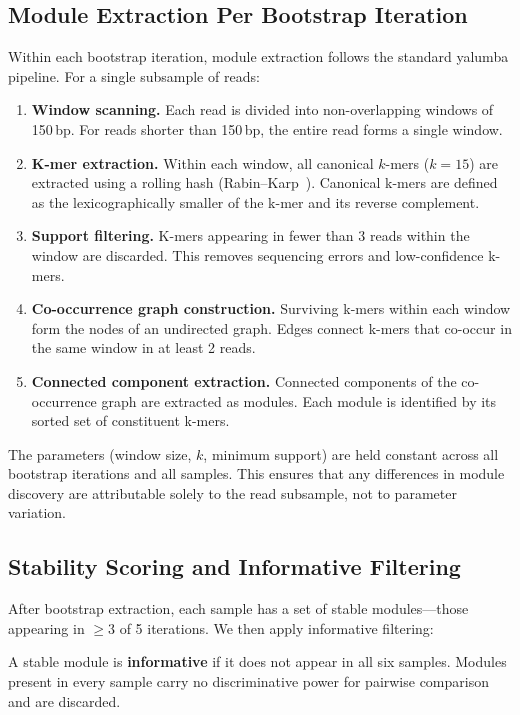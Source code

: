 \documentclass{../yalumba}
\begin{document}
\subsection{Module Extraction Per Bootstrap Iteration}

Within each bootstrap iteration, module extraction follows the standard
yalumba pipeline.  For a single subsample of reads:

\begin{enumerate}
  \item \textbf{Window scanning.}  Each read is divided into non-overlapping
    windows of 150\,bp.  For reads shorter than 150\,bp, the entire read forms
    a single window.
  \item \textbf{K-mer extraction.}  Within each window, all canonical
    $k$-mers ($k = 15$) are extracted using a rolling hash
    (Rabin--Karp~\cite{karp1987rabin}).  Canonical k-mers are defined as the
    lexicographically smaller of the k-mer and its reverse complement.
  \item \textbf{Support filtering.}  K-mers appearing in fewer than 3 reads
    within the window are discarded.  This removes sequencing errors and
    low-confidence k-mers.
  \item \textbf{Co-occurrence graph construction.}  Surviving k-mers within
    each window form the nodes of an undirected graph.  Edges connect k-mers
    that co-occur in the same window in at least 2 reads.
  \item \textbf{Connected component extraction.}  Connected components of
    the co-occurrence graph are extracted as modules.  Each module is
    identified by its sorted set of constituent k-mers.
\end{enumerate}

The parameters (window size, $k$, minimum support) are held constant across all
bootstrap iterations and all samples.  This ensures that any differences in
module discovery are attributable solely to the read subsample, not to parameter
variation.

\subsection{Stability Scoring and Informative Filtering}

After bootstrap extraction, each sample has a set of stable modules---those
appearing in $\geq 3$ of 5 iterations.  We then apply informative filtering:

\begin{definition}
A stable module is \textbf{informative} if it does not appear in all six
samples.  Modules present in every sample carry no discriminative power for
pairwise comparison and are discarded.
\end{definition}
\end{document}
